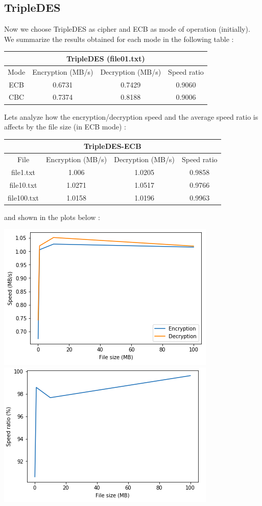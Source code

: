 \documentclass[11pt]{article}
\begin{document}
\subsection{TripleDES}
Now we choose TripleDES as cipher and ECB as mode of operation (initially). We summarize the results obtained for each mode in the following table :
\begin{center}
\begin{tabular}{| c | c | c | c |}
\hline
\multicolumn{4}{|c|}{TripleDES (file01.txt)} \\
\hline
Mode & Encryption (MB/s) & Decryption (MB/s) & Speed ratio\\
\hline
ECB & 0.6731 & 0.7429 & 0.9060 \\
\hline
CBC & 0.7374 & 0.8188 & 0.9006 \\
\hline
\end{tabular}
\end{center}
Lets analyze how the encryption/decryption speed and the average speed ratio is affects by the file size (in ECB mode) :
\begin{center}
\begin{tabular}{| c | c | c | c |}
\hline
\multicolumn{4}{|c|}{TripleDES-ECB} \\
\hline
File & Encryption (MB/s) & Decryption (MB/s) & Speed ratio\\
\hline
file1.txt & 1.006 & 1.0205 & 0.9858 \\
\hline
file10.txt & 1.0271 & 1.0517 & 0.9766 \\
\hline
file100.txt & 1.0158 & 1.0196 & 0.9963 \\
\hline
\end{tabular}
\end{center}
and shown in the plots below :
\begin{center}
\includegraphics[scale=0.4]{./enc_dec_speed_3des_ecb.png}
\includegraphics[scale=0.4]{./avg_speed_ratio_3des_ecb.png}
\end{center}
\end{document}
